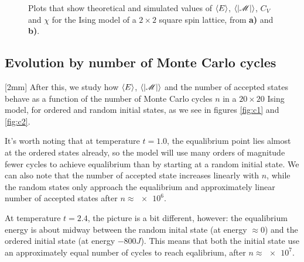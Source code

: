 \documentclass[12pt,a4paper]{article}
\newcommand\M[1]{\begin{bmatrix} #1 \end{bmatrix}} %
\def\M{\mathscr{M}}
\newcommand\oppg[1]{\reversemarginnote{\textcolor{black!40}{#1)}}[2mm]}
\begin{document}
\begin{figure}[!ht]

  \caption{Plots that show theoretical and simulated values of $\expval{E}$, $\expval{|\M|}$, $C_V$ and $\chi$ for the Ising model of a $2 \times 2$ square spin lattice, from \textbf{a)} and \textbf{b)}.} \label{fig:b}
\end{figure}

\subsection{Evolution by number of Monte Carlo cycles}
\oppg{c}
After this, we study how $\expval{E}$, $\expval{|\M|}$ and the number of accepted states behave as a function of the number of Monte Carlo cycles $n$ in a $20 \times 20$ Ising model, for ordered and random initial states, as we see in figures \ref{fig:c1} and \ref{fig:c2}.

It's worth noting that at temperature $t = 1.0$, the equalibrium point lies almost at the ordered states already, so the model will use many orders of magnitude fewer cycles to achieve equalibrium than by starting at a random initial state. We can also note that the number of accepted state increases linearly with $n$, while the random states only approach the equalibrium and approximately linear number of accepted states after $n \approx \num{e6}$.

At temperature $t = 2.4$, the picture is a bit different, however: the equalibrium energy is about midway between the random inital state (at energy $\approx 0$) and the ordered initial state (at energy $-800J$). This means that both the initial state use an approximately equal number of cycles to reach eqalibrium, after $n \approx \num{e7}$.
\end{document}
